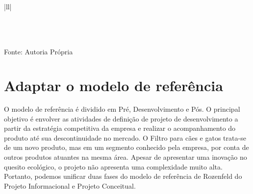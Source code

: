 \documentclass[
	12pt,				%
	openright,			%
	oneside,			%
	a4paper,			%
	english,			%
	french,				%
	spanish,			%
	brazil				%
	]{abntex2}
\begin{document}
{\begin{center}
\begin{longtable}[c]{|ll|}
 \\ \hline
{} \\ \hline
{} \\ \hline
{} \\ \hline
\end{longtable}
\centering \footnotesize{Fonte: Autoria Própria}
\end{center}
}



\section{Adaptar o modelo de referência}

O modelo de referência é dividido em Pré, Desenvolvimento e Pós. O principal objetivo é envolver as atividades de definição de projeto de desenvolvimento a partir da estratégia competitiva da empresa e realizar o acompanhamento do produto até sua descontinuidade no mercado. O Filtro para cães e gatos trata-se de um novo produto, mas em um segmento conhecido pela empresa, por conta de outros produtos atuantes na mesma área. Apesar de apresentar uma inovação no quesito ecológico, o projeto não apresenta uma complexidade muito alta. Portanto, podemos unificar duas fases do modelo de referência de Rozenfeld do Projeto Informacional e Projeto Conceitual.
\end{document}
